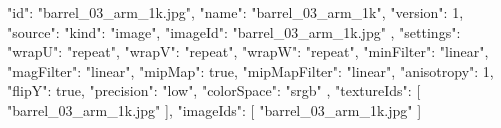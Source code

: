 {
  "id": "barrel_03_arm_1k.jpg",
  "name": "barrel_03_arm_1k",
  "version": 1,
  "source": {
    "kind": "image",
    "imageId": "barrel_03_arm_1k.jpg"
  },
  "settings": {
    "wrapU": "repeat",
    "wrapV": "repeat",
    "wrapW": "repeat",
    "minFilter": "linear",
    "magFilter": "linear",
    "mipMap": true,
    "mipMapFilter": "linear",
    "anisotropy": 1,
    "flipY": true,
    "precision": "low",
    "colorSpace": "srgb"
  },
  "textureIds": [
    "barrel_03_arm_1k.jpg"
  ],
  "imageIds": [
    "barrel_03_arm_1k.jpg"
  ]
}
